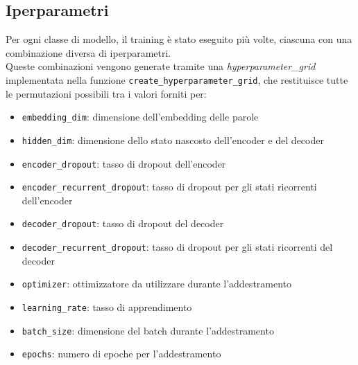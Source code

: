 \subsection{Iperparametri}
Per ogni classe di modello, il training è stato eseguito più volte, ciascuna con una combinazione diversa di iperparametri.\\
Queste combinazioni vengono generate tramite una \textit{hyperparameter\_grid}
implementata nella funzione \texttt{create\_hyperparameter\_grid}, che restituisce tutte le
permutazioni possibili tra i valori forniti per:
\begin{itemize}
    \item \texttt{embedding\_dim}: dimensione dell'embedding delle parole
    \item \texttt{hidden\_dim}: dimensione dello stato nascosto dell'encoder e del decoder
    \item \texttt{encoder\_dropout}: tasso di dropout dell'encoder
    \item \texttt{encoder\_recurrent\_dropout}: tasso di dropout per gli stati ricorrenti dell'encoder
    \item \texttt{decoder\_dropout}: tasso di dropout del decoder
    \item \texttt{decoder\_recurrent\_dropout}: tasso di dropout per gli stati ricorrenti del decoder
    \item \texttt{optimizer}: ottimizzatore da utilizzare durante l'addestramento
    \item \texttt{learning\_rate}: tasso di apprendimento
    \item \texttt{batch\_size}: dimensione del batch durante l'addestramento
    \item \texttt{epochs}: numero di epoche per l'addestramento
\end{itemize}

